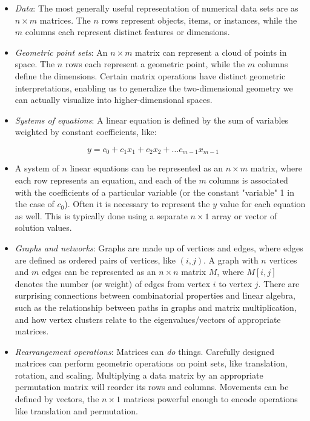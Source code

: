 \documentclass[10pt]{article}
\begin{document}
\begin{itemize}
  \item \textit{Data}: The most generally useful representation of numerical data sets are as $n \times m$ matrices. The $n$ rows represent objects, items, or instances, while the $m$ columns each represent distinct features or dimensions.
  \item \textit{Geometric point sets}: An $n \times m$ matrix can represent a cloud of points in space. The $n$ rows each represent a geometric point, while the $m$ columns define the dimensions. Certain matrix operations have distinct geometric interpretations, enabling us to generalize the two-dimensional geometry we can actually visualize into higher-dimensional spaces.
  \item \textit{Systems of equations}: A linear equation is defined by the sum of variables weighted by constant coefficients, like:
\end{itemize}

\[ y = c_0 + c_1 x_1 + c_2 x_2 + \ldots c_{m-1} x_{m-1} \]

\begin{itemize}
  \item A system of $n$ linear equations can be represented as an $n \times m$ matrix, where each row represents an equation, and each of the $m$ columns is associated with the coefficients of a particular variable (or the constant "variable" 1 in the case of $c_0$). Often it is necessary to represent the $y$ value for each equation as well. This is typically done using a separate $n \times 1$ array or vector of solution values.
  \item \textit{Graphs and networks}: Graphs are made up of vertices and edges, where edges are defined as ordered pairs of vertices, like $(i, j)$. A graph with $n$ vertices and $m$ edges can be represented as an $n \times n$ matrix $M$, where $M[i, j]$ denotes the number (or weight) of edges from vertex $i$ to vertex $j$. There are surprising connections between combinatorial properties and linear algebra, such as the relationship between paths in graphs and matrix multiplication, and how vertex clusters relate to the eigenvalues/vectors of appropriate matrices.
  \item \textit{Rearrangement operations}: Matrices can \textit{do} things. Carefully designed matrices can perform geometric operations on point sets, like translation, rotation, and scaling. Multiplying a data matrix by an appropriate permutation matrix will reorder its rows and columns. Movements can be defined by vectors, the $n \times 1$ matrices powerful enough to encode operations like translation and permutation.
\end{itemize}
\end{document}

